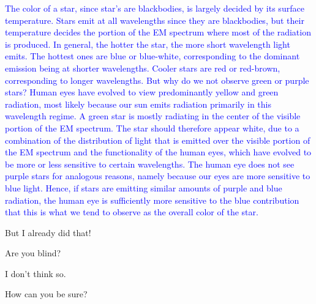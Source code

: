 \documentclass[main.tex]{subfiles}
\begin{document}
\begin{tcolorbox}[sharp corners, colback=blue!30, colframe=blue!80!blue, title=Why is a star observed to have a given color?]
\par \textcolor{blue} {%
The color of a star, since star's are blackbodies, is largely decided by its surface temperature. Stars emit at all wavelengths since they are blackbodies, but their temperature decides the portion of the EM spectrum where most of the radiation is produced.  In general, the hotter the star, the more short wavelength light emits. The hottest ones are blue or blue-white, corresponding to the dominant emission being at shorter wavelengths. Cooler stars are red or red-brown, corresponding to longer wavelengths. 
But why do we not observe green or purple stars?  Human eyes have evolved to view predominantly yellow and green radiation, most likely because our sun emits radiation primarily in this wavelength regime.  A green star is mostly radiating in the center of the visible portion of the EM spectrum. The star should therefore appear white, due to a combination of the distribution of light that is emitted over the visible portion of the EM spectrum and the functionality of the human eyes, which have evolved to be more or less sensitive to certain wavelengths.  The human eye does not see purple stars for analogous reasons, namely because our eyes are more sensitive to blue light.  Hence, if stars are emitting similar amounts of purple and blue radiation, the human eye is sufficiently more sensitive to the blue contribution that this is what we tend to observe as the overall color of the star.}
\end{tcolorbox}


\par \Maia But I already did that!

\par \Pleione Are you blind?

\par \Maia I don't think so.

\par \Pleione How can you be sure?
\end{document}
